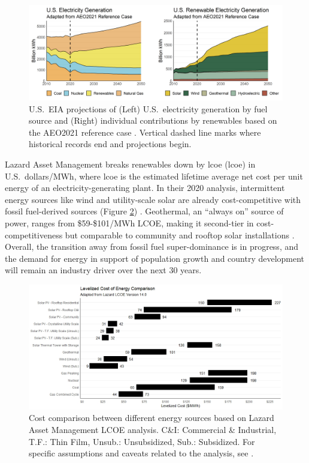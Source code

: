 \begin{figure}[htp]
\centering
\includegraphics[width=\textwidth]{templates/images/Figure-EIA_projections.png}
\caption[U.S.\ EIA projections based on the AEO2021 reference case]{U.S.\ EIA projections of (Left) U.S.\ electricity generation by fuel source and (Right) individual contributions by renewables based on the AEO2021 reference case \protect\citep{eia_annual_2021}. Vertical dashed line marks where historical records end and projections begin.}
\label{fig:eia_2021_projections}
\end{figure}

Lazard Asset Management breaks renewables down by \acrlong{lcoe} (\acrshort{lcoe}) in U.S.\ dollars/MWh, where \acrshort{lcoe} is the estimated lifetime average net cost per unit energy of an electricity-generating plant. In their 2020 analysis, intermittent energy sources like wind and utility-scale solar are already cost-competitive with fossil fuel-derived sources (Figure \ref{fig:lazard_lcoe}) \citep{lazard_lazards_2020}. Geothermal, an “always on” source of power, ranges from \$59-\$101/MWh LCOE, making it second-tier in cost-competitiveness but comparable to community and rooftop solar installations \citep{lazard_lazards_2020}. Overall, the transition away from fossil fuel super-dominance is in progress, and the demand for energy in support of population growth and country development will remain an industry driver over the next 30 years.
 
\begin{figure}[htp]
\centering
\includegraphics[width=\textwidth]{templates/images/Figure-Lazard_LCOE_recreated.jpeg}
\caption[Lazard Levelized Cost of Energy 2021 projections]{Cost comparison between different energy sources based on Lazard Asset Management LCOE analysis. C\&I: Commercial \& Industrial, T.F.: Thin Film, Unsub.: Unsubsidized, Sub.: Subsidized. For specific assumptions and caveats related to the analysis, see \protect\citep{lazard_lazards_2020}.}
\label{fig:lazard_lcoe}
\end{figure}

